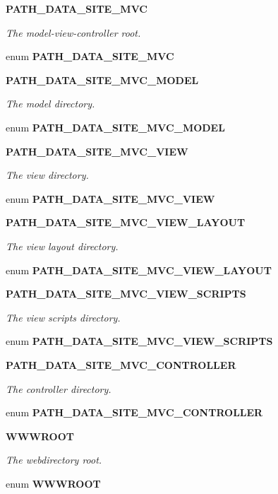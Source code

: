 \begin{Indent}{\bf PATH\_\-DATA\_\-SITE\_\-MVC}\par
{\em The model-view-controller root. }\begin{CompactItemize}
\item 
enum {\bf PATH\_\-DATA\_\-SITE\_\-MVC} 
\end{CompactItemize}
\end{Indent}
\begin{Indent}{\bf PATH\_\-DATA\_\-SITE\_\-MVC\_\-MODEL}\par
{\em The model directory. }\begin{CompactItemize}
\item 
enum {\bf PATH\_\-DATA\_\-SITE\_\-MVC\_\-MODEL} 
\end{CompactItemize}
\end{Indent}
\begin{Indent}{\bf PATH\_\-DATA\_\-SITE\_\-MVC\_\-VIEW}\par
{\em The view directory. }\begin{CompactItemize}
\item 
enum {\bf PATH\_\-DATA\_\-SITE\_\-MVC\_\-VIEW} 
\end{CompactItemize}
\end{Indent}
\begin{Indent}{\bf PATH\_\-DATA\_\-SITE\_\-MVC\_\-VIEW\_\-LAYOUT}\par
{\em The view layout directory. }\begin{CompactItemize}
\item 
enum {\bf PATH\_\-DATA\_\-SITE\_\-MVC\_\-VIEW\_\-LAYOUT} 
\end{CompactItemize}
\end{Indent}
\begin{Indent}{\bf PATH\_\-DATA\_\-SITE\_\-MVC\_\-VIEW\_\-SCRIPTS}\par
{\em The view scripts directory. }\begin{CompactItemize}
\item 
enum {\bf PATH\_\-DATA\_\-SITE\_\-MVC\_\-VIEW\_\-SCRIPTS} 
\end{CompactItemize}
\end{Indent}
\begin{Indent}{\bf PATH\_\-DATA\_\-SITE\_\-MVC\_\-CONTROLLER}\par
{\em The controller directory. }\begin{CompactItemize}
\item 
enum {\bf PATH\_\-DATA\_\-SITE\_\-MVC\_\-CONTROLLER} 
\end{CompactItemize}
\end{Indent}
\begin{Indent}{\bf WWWROOT}\par
{\em The webdirectory root. }\begin{CompactItemize}
\item 
enum {\bf WWWROOT} 
\end{CompactItemize}
\end{Indent}
